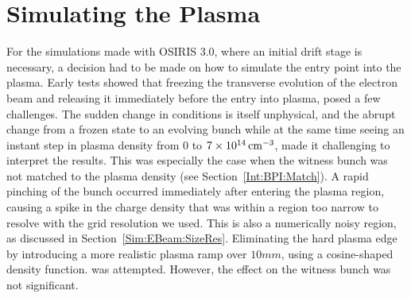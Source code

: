 \section{Simulating the Plasma}
\label{Sim:Plasma}

For the simulations made with OSIRIS 3.0, where an initial drift stage is necessary, a decision had to be made on how to simulate the entry point into the plasma.
Early tests showed that freezing the transverse evolution of the electron beam and releasing it immediately before the entry into plasma, posed a few challenges.
The sudden change in conditions is itself unphysical, and the abrupt change from a frozen state to an evolving bunch while at the same time seeing an instant step in plasma density from $0$ to $7\times 10^{14}\,\mathrm{cm}^{-3}$, made it challenging to interpret the results.
This was especially the case when the witness bunch was not matched to the plasma density (see Section~\ref{Int:BPI:Match}).
A rapid pinching of the bunch occurred immediately after entering the plasma region, causing a spike in the charge density that was within a region too narrow to resolve with the grid resolution we used.
This is also a numerically noisy region, as discussed in Section~\ref{Sim:EBeam:SizeRes}.
Eliminating the hard plasma edge by introducing a more realistic plasma ramp over $10\unit{mm}$, using a cosine-shaped density function. was attempted.
However, the effect on the witness bunch was not significant.
